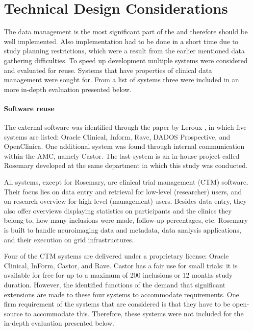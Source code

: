 \section{Technical Design Considerations}
\label{reuse}


The data management is the most significant part of the \ivfsystem{} and therefore should be well implemented.
Also implementation had to be done in a short time due to study planning restrictions, which were a result from the earlier mentioned data gathering difficulties.
To speed up development multiple systems were considered and evaluated for reuse.
Systems that have properties of clinical data management were sought for.
From a list of systems three were included in an more in-depth evaluation presented below.

\paragraph{Software reuse}
The external software was identified through the paper by Leroux \cite{leroux2011}, in which five systems are listed: Oracle Clinical, Inform, Rave, DADOS Prospective, and OpenClinica.
One additional system was found through internal communication within the AMC, namely Castor.
The last system is an in-house project called Rosemary developed at the same department in which this study was conducted.

All systems, except for Rosemary, are clinical trial management (CTM) software.
Their focus lies on data entry and retrieval for low-level (researcher) users, and on research overview for high-level (management) users.
Besides data entry, they also offer overviews displaying statistics on participants and the clinics they belong to, how many inclusions were made, follow-up percentages, etc.
Rosemary is built to handle neuroimaging data and metadata, data analysis applications, and their execution on grid infrastructures.

Four of the CTM systems are delivered under a proprietary license: Oracle Clinical, InForm, Castor, and Rave.
Castor has a fair use for small trials: it is available for free for up to a maximum of 200 inclusions or 12 months study duration.
However, the identified functions of the \ivfsystem{} demand that significant extensions are made to these four systems to accommodate requirements.
One firm requirement of the systems that are considered is that they have to be open-source to accommodate this.
Therefore, these systems were not included for the in-depth evaluation presented below.

